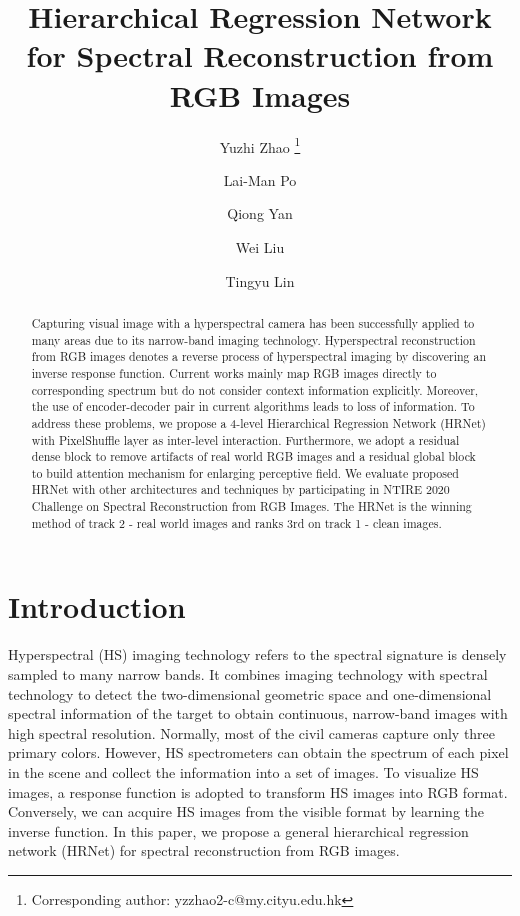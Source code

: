 \documentclass[10pt,twocolumn,letterpaper]{article}
\begin{document}
\title{Hierarchical Regression Network for Spectral Reconstruction from RGB Images}

\author[1]{Yuzhi Zhao \thanks{Corresponding author: yzzhao2-c@my.cityu.edu.hk}}
\author[1]{Lai-Man Po}
\author[2]{Qiong Yan}
\author[2,3]{Wei Liu}
\author[1]{Tingyu Lin}

\renewcommand\Authands{ , } 

\maketitle
\pagestyle{empty}  \thispagestyle{empty} 

\begin{abstract}

Capturing visual image with a hyperspectral camera has been successfully applied to many areas due to its narrow-band imaging technology. Hyperspectral reconstruction from RGB images denotes a reverse process of hyperspectral imaging by discovering an inverse response function. Current works mainly map RGB images directly to corresponding spectrum but do not consider context information explicitly. Moreover, the use of encoder-decoder pair in current algorithms leads to loss of information. To address these problems, we propose a 4-level Hierarchical Regression Network (HRNet) with PixelShuffle layer as inter-level interaction. Furthermore, we adopt a residual dense block to remove artifacts of real world RGB images and a residual global block to build attention mechanism for enlarging perceptive field. We evaluate proposed HRNet with other architectures and techniques by participating in NTIRE 2020 Challenge on Spectral Reconstruction from RGB Images. The HRNet is the winning method of track 2 - real world images and ranks 3rd on track 1 - clean images.

\end{abstract}

\section{Introduction}

Hyperspectral (HS) imaging technology refers to the spectral signature is densely sampled to many narrow bands. It combines imaging technology with spectral technology to detect the two-dimensional geometric space and one-dimensional spectral information of the target to obtain continuous, narrow-band images with high spectral resolution. Normally, most of the civil cameras capture only three primary colors. However, HS spectrometers can obtain the spectrum of each pixel in the scene and collect the information into a set of images. To visualize HS images, a response function is adopted to transform HS images into RGB format. Conversely, we can acquire HS images from the visible format by learning the inverse function. In this paper, we propose a general hierarchical regression network (HRNet) for spectral reconstruction from RGB images.
\end{document}
